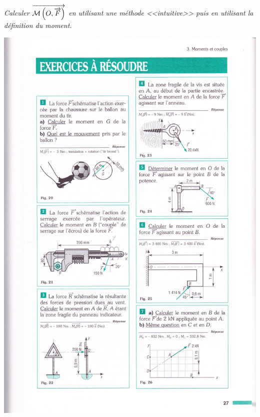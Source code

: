 \documentclass[10pt]{article}
\begin{document}
\begin{minipage}[c]{.68\linewidth}
\subparagraph*{}
\textit{Calculer $\overrightarrow{\mathcal{M}\left(O,\overrightarrow{F}\right)}$ en utilisant une méthode <<intuitive>> puis en utilisant la définition du moment.}
\end{minipage}\hfill
\begin{minipage}[c]{.3\linewidth}
\begin{center}
\includegraphics[width=\textwidth]{images/moment5}
\end{center}
\end{minipage}
\end{document}
